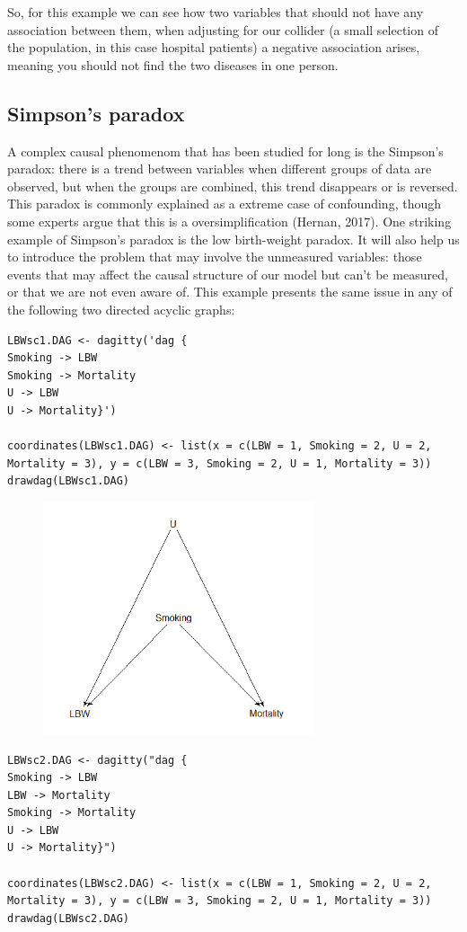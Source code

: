\documentclass{article}
\begin{document}
So, for this example we can see how two variables that should not have any association between them, when adjusting for our collider (a small selection of the population, in this case hospital patients) a negative association arises, meaning you should not find the two diseases in one person.


\subsection{Simpson's paradox}

A complex causal phenomenom that has been studied for long is the Simpson's paradox: there is a trend between variables when different groups of data are observed, but when the groups are combined, this trend disappears or is reversed. This paradox is commonly explained as a extreme case of confounding, though some experts argue that this is a oversimplification (Hernan, 2017).
One striking example of Simpson's paradox is the low birth-weight paradox. It will also help us to introduce the problem that may involve the unmeasured variables: those events that may affect the causal structure of our model but can't be measured, or that we are not even aware of. This example presents the same issue in any of the following two directed acyclic graphs:
\begin{lstlisting}
LBWsc1.DAG <- dagitty('dag {
Smoking -> LBW
Smoking -> Mortality
U -> LBW
U -> Mortality}')

coordinates(LBWsc1.DAG) <- list(x = c(LBW = 1, Smoking = 2, U = 2, Mortality = 3), y = c(LBW = 3, Smoking = 2, U = 1, Mortality = 3))
drawdag(LBWsc1.DAG)
\end{lstlisting}
\begin{figure}[h]
\includegraphics[width=8cm]{LBW1DAG.png}
\centering
\end{figure}
\newpage
\begin{lstlisting}
LBWsc2.DAG <- dagitty("dag {
Smoking -> LBW
LBW -> Mortality
Smoking -> Mortality
U -> LBW
U -> Mortality}")

coordinates(LBWsc2.DAG) <- list(x = c(LBW = 1, Smoking = 2, U = 2, Mortality = 3), y = c(LBW = 3, Smoking = 2, U = 1, Mortality = 3))
drawdag(LBWsc2.DAG)
\end{lstlisting}
\end{document}
